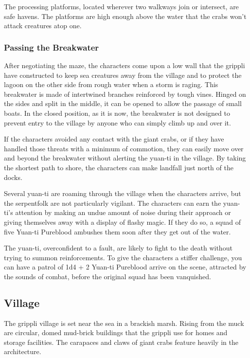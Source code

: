 \documentclass[10pt,a4paper,twoside,bg=print,twocolumn,openany,nodeprecatedcode]{dndbook}
\begin{document}
The processing platforms, located wherever two walkways join or intersect, are safe havens. The platforms are high enough above the water that the crabs won't attack creatures atop one.

\subsubsection{Passing the Breakwater}
After negotiating the maze, the characters come upon a low wall that the grippli have constructed to keep sea creatures away from the village and to protect the lagoon on the other side from rough water when a storm is raging. This breakwater is made of intertwined branches reinforced by tough vines. Hinged on the sides and split in the middle, it can be opened to allow the passage of small boats. In the closed position, as it is now, the breakwater is not designed to prevent entry to the village by anyone who can simply climb up and over it.

If the characters avoided any contact with the giant crabs, or if they have handled those threats with a minimum of commotion, they can easily move over and beyond the breakwater without alerting the yuan-ti in the village. By taking the shortest path to shore, the characters can make landfall just north of the docks.

Several yuan-ti are roaming through the village when the characters arrive, but the serpentfolk are not particularly vigilant. The characters can earn the yuan-ti's attention by making an undue amount of noise during their approach or giving themselves away with a display of flashy magic. If they do so, a squad of five Yuan-ti Pureblood ambushes them soon after they get out of the water.

The yuan-ti, overconfident to a fault, are likely to fight to the death without trying to summon reinforcements. To give the characters a stiffer challenge, you can have a patrol of 1d4 + 2 Yuan-ti Pureblood arrive on the scene, attracted by the sounds of combat, before the original squad has been vanquished.

\subsection{Village}
\begin{DndReadAloud}{}
The grippli village is set near the sea in a brackish marsh. Rising from the muck are circular, domed mud-brick buildings that the grippli use for homes and storage facilities. The carapaces and claws of giant crabs feature heavily in the architecture.

\end{DndReadAloud}
\end{document}
